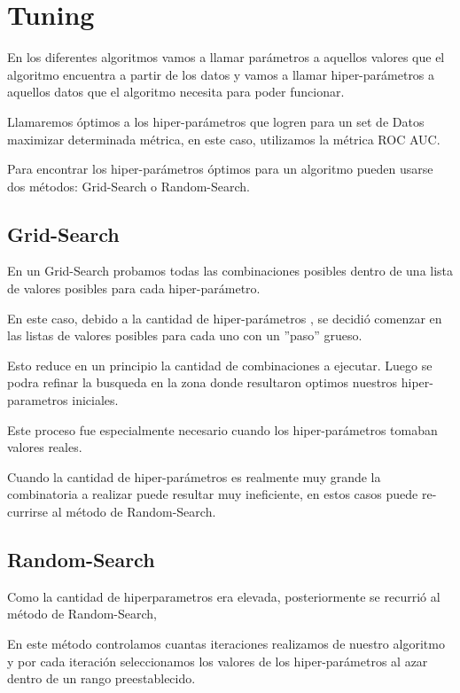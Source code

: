 \documentclass[a4paper ,12pt]{article}
\begin{document}
\newpage
\section{Tuning}

En los diferentes algoritmos vamos a llamar parámetros a aquellos valores que el algoritmo encuentra a partir de los datos y vamos a llamar hiper-parámetros a
aquellos datos que el algoritmo necesita para poder funcionar.

Llamaremos óptimos a los hiper-parámetros que logren para un set de Datos maximizar determinada métrica, en este caso, utilizamos la métrica ROC AUC.\

Para encontrar los hiper-parámetros óptimos para un algoritmo pueden usarse dos métodos: Grid-Search o Random-Search.\\

\subsection{Grid-Search}

En un Grid-Search probamos todas las combinaciones posibles dentro de una lista de valores posibles para cada hiper-parámetro.

En este caso, debido a la cantidad de hiper-parámetros , se decidió comenzar en las listas de valores posibles para cada uno con un ”paso” grueso.

Esto reduce en un principio la cantidad de combinaciones a ejecutar. Luego se podra refinar la busqueda en la zona donde resultaron optimos nuestros hiper-parametros iniciales.

Este proceso fue especialmente necesario cuando los hiper-parámetros tomaban valores reales.

Cuando la cantidad de hiper-parámetros es realmente muy grande la combinatoria a realizar puede resultar muy ineficiente, en estos casos puede re-
currirse al método de Random-Search.

\subsection{Random-Search}

Como la cantidad de hiperparametros era elevada, posteriormente se recurrió al método de Random-Search,

En este método controlamos cuantas iteraciones realizamos de nuestro algoritmo y por cada iteración seleccionamos los valores de los
hiper-parámetros al azar dentro de un rango preestablecido. 
\end{document}
